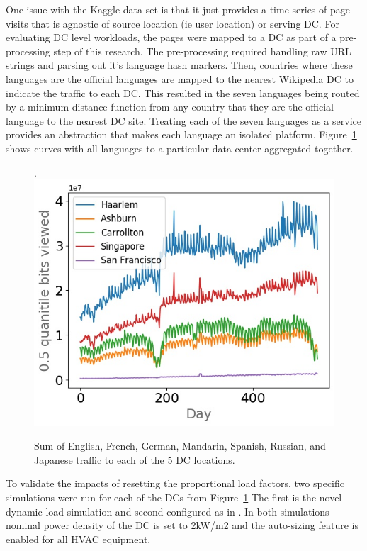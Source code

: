 One issue with the Kaggle data set is that it just provides a time series of page visits that is agnostic of source location (ie user location) or serving DC. For evaluating DC level workloads, the pages were mapped to a DC as part of a pre-processing step of this research. The pre-processing required handling raw URL strings and parsing out it's language hash markers. Then, countries where these languages are the official languages are mapped to the nearest Wikipedia DC to indicate the traffic to each DC.  This resulted in the seven languages being routed by a minimum distance function from any country that they are the official language to the nearest DC site. Treating each of the seven languages as a service  provides an abstraction that makes each language an isolated platform. Figure~\ref{fig:lang2dc} shows curves with all languages to a particular data center aggregated together. 

\begin{figure}.
\centering
\includegraphics[scale=0.45]{img/lang2dc_curve.jpg}
\caption{Sum of English, French, German, Mandarin, Spanish, Russian, and Japanese traffic to each of the 5 DC locations.}
\label{fig:lang2dc}
\end{figure}


To validate the impacts of resetting the proportional load factors, two specific simulations were run for each of the DCs from Figure~\ref{fig:lang2dc} The first is the novel dynamic load simulation and second configured as in \citep{moriyama18}. In both simulations nominal power density of the DC is set to 2kW/m2 and the auto-sizing feature is enabled for all HVAC equipment. 

